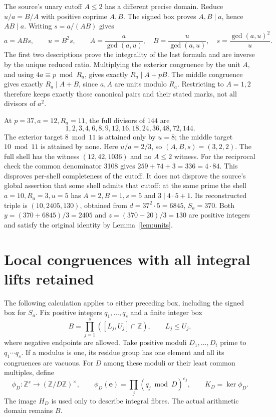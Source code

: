 \documentclass[11pt]{article}
\theoremstyle{definition}\newtheorem{definition}[theorem]{Definition}
\theoremstyle{remark}\newtheorem{remark}[theorem]{Remark}
\newcommand{\Z}{\mathbb Z}\newcommand{\Q}{\mathbb Q}
\begin{document}
The source's unary cutoff \(A\le2\) has a different
precise domain.  Reduce \(u/a=B/A\) with positive
coprime \(A,B\).  The signed box proves \(A,B\mid a\),
hence \(AB\mid a\).  Writing \(s=a/(AB)\) gives
\[
 a=ABs,\qquad u=B^2s,\qquad
 A=\frac{a}{\gcd(a,u)},\quad
 B=\frac{u}{\gcd(a,u)},\quad
 s=\frac{\gcd(a,u)^2}{u}.
\]
The first two descriptions prove the integrality of
the last formula and are inverse by the unique reduced
ratio.  Multiplying the exterior congruence by the
unit \(A\), and using \(4a\equiv p\bmod R_a\),
gives exactly \(R_a\mid A+pB\).  The middle congruence
gives exactly \(R_a\mid A+B\), since \(a,A\) are
units modulo \(R_a\).  Restricting to \(A=1,2\)
therefore keeps exactly those canonical pairs and
their stated marks, not all divisors of \(a^2\).

At \(p=37,a=12,R_a=11\), the full divisors of \(144\)
are
\[
 1,2,3,4,6,8,9,12,16,18,24,36,48,72,144 .
\]
The exterior target \(8\bmod11\) is attained only by
\(u=8\); the middle target \(10\bmod11\) is attained
by none.  Here \(u/a=2/3\), so \((A,B,s)=(3,2,2)\).
The full shell has the witness
\((12,42,1036)\) and no \(A\le2\) witness.
For the reciprocal check the common denominator 3108
gives \(259+74+3=336=4\cdot84\).
This disproves per-shell completeness of the cutoff.
It does not disprove the source's global assertion
that some shell admits that cutoff: at the same prime
the shell \(a=10,R_a=3,u=5\) has \(A=2,B=1,s=5\)
and \(3\mid4\cdot5+1\).  Its reconstructed triple is
\((10,2405,130)\), obtained from
\(d=37^2\cdot5=6845\), \(S_a=370\).
Both \(y=(370+6845)/3=2405\) and
\(z=(370+20)/3=130\) are positive integers and satisfy
the original identity by Lemma~\ref{lem:units}.




\section{Local congruences with all integral lifts retained}

The following calculation applies to either preceding box, including
the signed box for \(S_a\).  Fix positive integers \(q_1,\ldots,q_s\)
and a finite integer box
\[
 B=\prod_{j=1}^s([L_j,U_j]\cap\Z),\qquad L_j\le U_j,
\]
where negative endpoints are allowed.  Take positive moduli
\(D_1,\ldots,D_t\) prime to \(q_1\cdots q_s\).  If a modulus is one,
its residue group has one element and all its congruences are
vacuous.  For \(D\) among these moduli or their least common
multiples, define
\[
 \phi_D:\Z^s\longrightarrow(\Z/D\Z)^\times,\qquad
 \phi_D(\boldsymbol e)=\prod_j(q_j\bmod D)^{e_j},\qquad
 K_D=\ker\phi_D .
\]
The image \(H_D\) is used only to describe integral fibres.  The
actual arithmetic domain remains \(B\).
\end{document}
